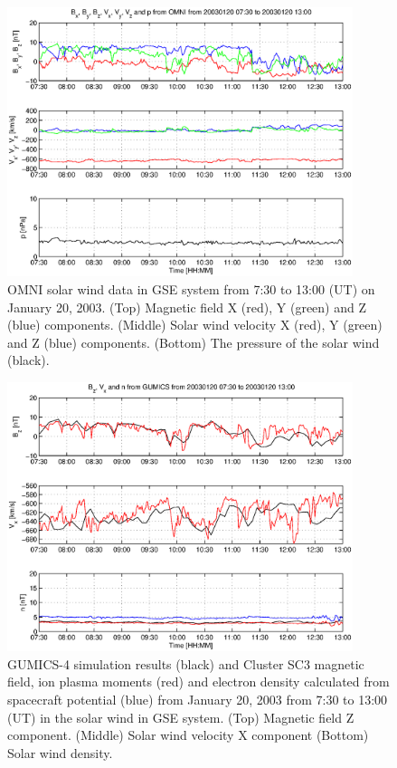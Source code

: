 \documentclass[linenumbers,draft]{agujournal}
\begin{document}
\begin{figure}[h]
\centering
\includegraphics[width=0.9\textwidth,angle=0]{swe-2020-corr-f02.eps}  
\caption{OMNI solar wind data in GSE system from 7:30 to 13:00 (UT) on January 20, 2003. (Top) Magnetic field X (red), Y (green) and Z (blue) components. (Middle) Solar wind velocity X (red), Y (green) and Z (blue) components. (Bottom) The pressure of the solar wind (black).}
\label{fig:swomni}
\end{figure}

\pagebreak

\begin{figure}[h]
\centering
\includegraphics[width=0.9\textwidth,angle=0]{swe-2020-corr-f03.eps}  
\caption{GUMICS-4 simulation results (black) and Cluster SC3 magnetic field, ion plasma moments (red) and electron density calculated from spacecraft potential (blue) from January 20, 2003 from 7:30 to 13:00 (UT) in the solar wind in GSE system. (Top) Magnetic field Z component. (Middle) Solar wind velocity X component (Bottom) Solar wind density.}
\label{fig:swplot}
\end{figure}
\end{document}
